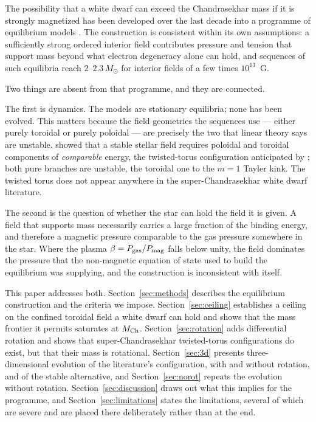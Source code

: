 \documentclass[twocolumn,linenumbers]{aastex701}
\newcommand{\Msun}{M_\odot}
\newcommand{\Mch}{M_{\rm Ch}}
\begin{document}

The possibility that a white dwarf can exceed the Chandrasekhar mass if it is
strongly magnetized has been developed over the last decade into a
programme of equilibrium models
\citep[e.g.][]{subramanian2015,gupta2020,deb2022}. The construction is
consistent within its own assumptions: a sufficiently strong ordered interior
field contributes pressure and tension that support mass beyond what electron
degeneracy alone can hold, and sequences of such equilibria reach
$2$--$2.3\,\Msun$ for interior fields of a few times $10^{13}$~G.

Two things are absent from that programme, and they are connected.

The first is dynamics. The models are stationary equilibria; none has been
evolved. This matters because the field geometries the sequences use --- either
purely toroidal or purely poloidal --- are precisely the two that linear
theory says are unstable. \citet{braithwaite2006} showed that a stable
stellar field requires poloidal and toroidal components of \emph{comparable}
energy, the twisted-torus configuration anticipated by \citet{prendergast1956};
both pure branches are unstable, the toroidal one to the $m=1$ Tayler kink.
The twisted torus does not appear anywhere in the super-Chandrasekhar white
dwarf literature.

The second is the question of whether the star can hold the field it is given.
A field that supports mass necessarily carries a large fraction of the
binding energy, and therefore a magnetic pressure comparable to the gas
pressure somewhere in the star. Where the plasma $\beta = P_{\rm gas}/P_{\rm
mag}$ falls below unity, the field dominates the pressure that the
non-magnetic equation of state used to build the equilibrium was supplying,
and the construction is inconsistent with itself.

This paper addresses both. Section~\ref{sec:methods} describes the equilibrium
construction and the criteria we impose. Section~\ref{sec:ceiling} establishes
a ceiling on the confined toroidal field a white dwarf can hold and shows that
the mass frontier it permits saturates at $\Mch$. Section~\ref{sec:rotation}
adds differential rotation and shows that super-Chandrasekhar twisted-torus
configurations do exist, but that their mass is rotational.
Section~\ref{sec:3d} presents three-dimensional evolution of the literature's
configuration, with and without rotation, and of the stable alternative, and
Section~\ref{sec:norot}
repeats the evolution without rotation. Section~\ref{sec:discussion}
draws out what this implies for the programme, and
Section~\ref{sec:limitations} states the limitations, several of which are
severe and are placed there deliberately rather than at the end.
\end{document}

